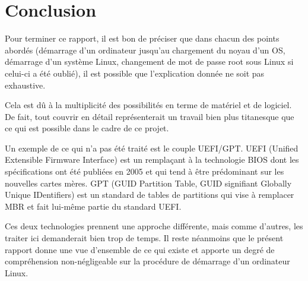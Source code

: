 \section{Conclusion}
Pour terminer ce rapport, il est bon de préciser que dans chacun des points abordés (démarrage d'un ordinateur jusqu'au chargement du noyau d'un OS, démarrage d'un système Linux, changement de mot de passe root sous Linux si celui-ci a été oublié), il est possible que l'explication donnée ne soit pas exhaustive. 

Cela est dû à la multiplicité des possibilités en terme de matériel et de logiciel. De fait, tout couvrir en détail représenterait un travail bien plus titanesque que ce qui est possible dans le cadre de ce projet. 

Un exemple de ce qui n'a pas été traité est le couple UEFI/GPT. UEFI (Unified Extensible Firmware Interface) est un remplaçant à la technologie BIOS dont les spécifications ont été publiées en 2005 et qui tend à être prédominant sur les nouvelles cartes mères. GPT (GUID Partition Table, GUID signifiant Globally Unique IDentifiers) est un standard de tables de partitions qui vise à remplacer MBR et fait lui-même partie du standard UEFI. 

Ces deux technologies prennent une approche différente, mais comme d'autres, les traiter ici demanderait bien trop de temps. Il reste néanmoins que le présent rapport donne une vue d'ensemble de ce qui existe et apporte un degré de compréhension non-négligeable sur la procédure de démarrage d'un ordinateur Linux. 